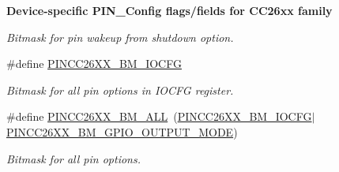 \begin{Indent}{\bf Device-\/specific P\-I\-N\-\_\-\-Config flags/fields for C\-C26xx family}
\begin{DoxyCompactItemize}
\begin{DoxyCompactList}\small\item\em Bitmask for pin wakeup from shutdown option. \end{DoxyCompactList}\item 
\#define \hyperlink{_p_i_n_c_c26_x_x_8h_aa0f69a925a6849e92f2b52506dce84fe}{P\-I\-N\-C\-C26\-X\-X\-\_\-\-B\-M\-\_\-\-I\-O\-C\-F\-G}
\begin{DoxyCompactList}\small\item\em Bitmask for all pin options in I\-O\-C\-F\-G register. \end{DoxyCompactList}\item 
\#define \hyperlink{_p_i_n_c_c26_x_x_8h_ad738c6c4e365f3a63d4a5620ecfa9766}{P\-I\-N\-C\-C26\-X\-X\-\_\-\-B\-M\-\_\-\-A\-L\-L}~(\hyperlink{_p_i_n_c_c26_x_x_8h_aa0f69a925a6849e92f2b52506dce84fe}{P\-I\-N\-C\-C26\-X\-X\-\_\-\-B\-M\-\_\-\-I\-O\-C\-F\-G}$|$\hyperlink{_p_i_n_c_c26_x_x_8h_a66fd916ff55cf49609303cec1c82f2bc}{P\-I\-N\-C\-C26\-X\-X\-\_\-\-B\-M\-\_\-\-G\-P\-I\-O\-\_\-\-O\-U\-T\-P\-U\-T\-\_\-\-M\-O\-D\-E})
\begin{DoxyCompactList}\small\item\em Bitmask for all pin options. \end{DoxyCompactList}\end{DoxyCompactItemize}
\end{Indent}

